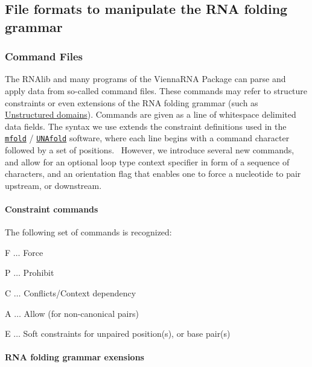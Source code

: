 \hypertarget{file_formats_constraint-formats}{}\subsection{File formats to manipulate the R\+N\+A folding grammar}\label{file_formats_constraint-formats}
\hypertarget{file_formats_constraint-formats-file}{}\subsubsection{Command Files}\label{file_formats_constraint-formats-file}
The R\+N\+Alib and many programs of the Vienna\+R\+NA Package can parse and apply data from so-\/called command files. These commands may refer to structure constraints or even extensions of the R\+NA folding grammar (such as \hyperlink{group__domains__up}{Unstructured domains}). Commands are given as a line of whitespace delimited data fields. The syntax we use extends the constraint definitions used in the \href{http://mfold.rna.albany.edu/?q=mfold}{\tt mfold} / \href{http://mfold.rna.albany.edu/?q=DINAMelt/software}{\tt U\+N\+Afold} software, where each line begins with a command character followed by a set of positions.~\newline
However, we introduce several new commands, and allow for an optional loop type context specifier in form of a sequence of characters, and an orientation flag that enables one to force a nucleotide to pair upstream, or downstream.\hypertarget{file_formats_constraint_commands}{}\paragraph{Constraint commands}\label{file_formats_constraint_commands}
The following set of commands is recognized\+:
\begin{DoxyItemize}
\item {\ttfamily F} $ \ldots $ Force
\item {\ttfamily P} $ \ldots $ Prohibit
\item {\ttfamily C} $ \ldots $ Conflicts/\+Context dependency
\item {\ttfamily A} $ \ldots $ Allow (for non-\/canonical pairs)
\item {\ttfamily E} $ \ldots $ Soft constraints for unpaired position(s), or base pair(s)
\end{DoxyItemize}\hypertarget{file_formats_domain_commands}{}\paragraph{R\+N\+A folding grammar exensions}\label{file_formats_domain_commands}

